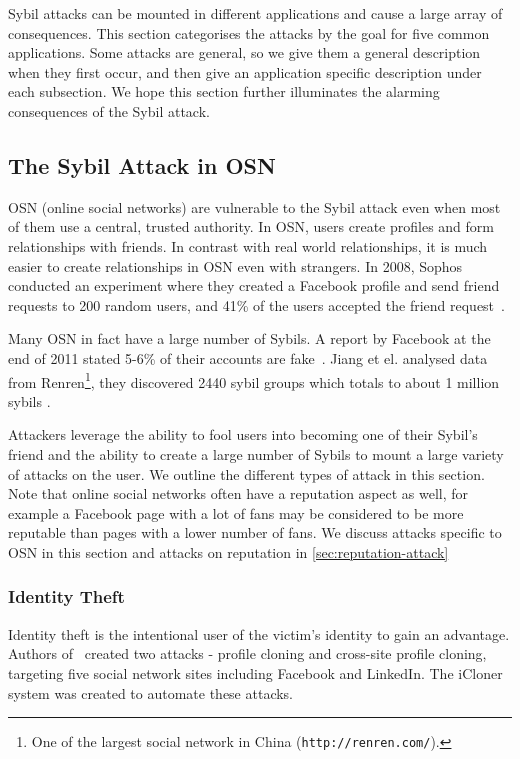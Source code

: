 
Sybil attacks can be mounted in different applications and cause a large array
of consequences. This section categorises the attacks by the goal for five
common applications. Some attacks are general, so we give them a general
description when they first occur, and then give an application specific
description under each subsection. We hope this section further illuminates the
alarming consequences of the Sybil attack.

\subsection{The Sybil Attack in OSN}
OSN (online social networks) are vulnerable to the Sybil attack even when most
of them use a central, trusted authority. In OSN, users create
profiles and form relationships with friends. In contrast with real world
relationships, it is much easier to create relationships in OSN even with
strangers. In 2008, Sophos conducted an experiment where they created a Facebook
profile and send friend requests to 200 random users, and 41\% of the users
accepted the friend request~\cite{sophos}.

Many OSN in fact have a large number of Sybils. A report by Facebook at the end
of 2011 stated 5-6\% of their accounts are fake~\cite{facebookfake}. Jiang et
el. analysed data from Renren\footnote{One of the largest social network in
  China (\texttt{http://renren.com/}).}, they discovered 2440 sybil groups which
totals to about 1 million sybils \cite{jiang2015understanding}.

Attackers leverage the ability to fool users into becoming one of their Sybil's
friend and the ability to create a large number of Sybils to mount a large
variety of attacks on the user. We outline the different types of attack in this
section. Note that online social networks often have a reputation aspect as
well, for example a Facebook page with a lot of fans may be considered to be
more reputable than pages with a lower number of fans. We discuss attacks
specific to OSN in this section and attacks on reputation in
\autoref{sec:reputation-attack}

\subsubsection{Identity Theft}
Identity theft is the intentional user of the victim's identity to gain an
advantage. Authors of~\cite{bilge2009all} created two attacks - profile cloning
and cross-site profile cloning, targeting five social network sites including
Facebook and LinkedIn. The iCloner system was created to automate these attacks.

